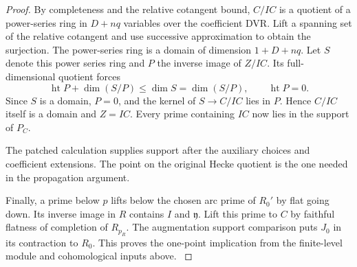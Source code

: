 \begin{proof}
By completeness and the relative cotangent bound,
\(C/IC\) is a quotient of a power-series ring in
\(D+nq\) variables over the coefficient DVR. Lift a
spanning set of the relative cotangent and use
successive approximation to obtain the surjection.
The power-series ring is a domain of dimension
\(1+D+nq\). Let \(S\) denote this power series ring and \(P\) the inverse image of \(Z/IC\). Its full-dimensional quotient forces
\[
 \operatorname{ht}P+\dim(S/P)\le\dim S=\dim(S/P),
 \qquad \operatorname{ht}P=0.
\]
Since \(S\) is a domain, \(P=0\), and the kernel of \(S\to C/IC\) lies in \(P\). Hence \(C/IC\) itself is a domain and
\(Z=IC\). Every prime containing \(IC\) now lies in
the support of \(P_C\).


The patched calculation supplies support after the auxiliary choices and coefficient extensions. The point on the original Hecke quotient is the one needed in the propagation argument.


Finally, a prime below \(p\) lifts below the chosen
arc prime of \(R_0'\) by flat going down. Its inverse
image in \(R\) contains \(I\) and \(\mathfrak y\).
Lift this prime to \(C\) by faithful flatness of
completion of \(R_{p_R}\). The augmentation support
comparison puts \(J_0\) in its contraction to \(R_0\).
This proves the one-point implication from the
finite-level module and cohomological inputs above.
\label{cor:ordinary-ordinary-patching-1}
\end{proof}
